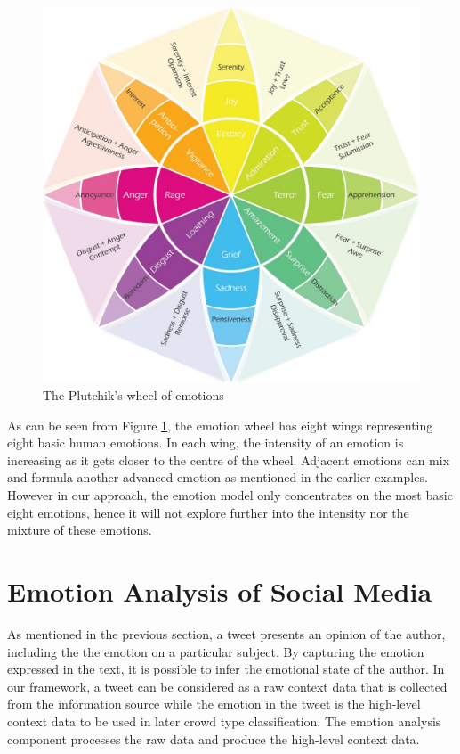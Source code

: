 \begin{figure}[htbp!] 
\centering    
\includegraphics[width=1.0\textwidth]{PlutchikModel}
\caption{The Plutchik's wheel of emotions}
\label{fig:emotionModel}
\end{figure}

As can be seen from Figure \ref{fig:emotionModel}, the emotion wheel has eight wings representing eight basic human emotions. In each wing, the intensity of an emotion is increasing as it gets closer to the centre of the wheel. Adjacent emotions can mix and formula another advanced emotion as mentioned in the earlier examples. However in our approach, the emotion model only concentrates on the most basic eight emotions, hence it will not explore further into the intensity nor the mixture of these emotions.

\section{Emotion Analysis of Social Media}

As mentioned in the previous section, a tweet presents an opinion of the author, including the the emotion on a particular subject. By capturing the emotion expressed in the text, it is possible to infer the emotional state of the author. In our framework, a tweet can be considered as a raw context data that is collected from the information source while the emotion in the tweet is the high-level context data to be used in later crowd type classification. The emotion analysis component processes the raw data and produce the high-level context data.

